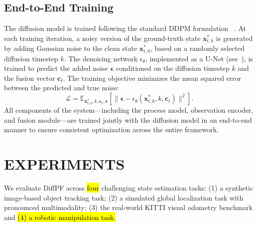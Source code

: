 \subsection{End-to-End Training}
The diffusion model is trained following the standard DDPM formulation ~\cite{ho2020denoising}. 
At each training iteration, a noisy version of the ground-truth state $\bm{x}_{t,k}^*$ is generated by adding Gaussian noise to the clean state $\bm{x}_{t,0}^*$, based on a randomly selected diffusion timestep $k$.
The denoising network $\epsilon_\theta$, implemented as a U-Net (see~), is trained to predict the added noise $\bm{\epsilon}$ conditioned on the diffusion timestep $k$ and the fusion vector $\bm{c}_t$.
The training objective minimizes the mean squared error between the predicted and true noise:
\begin{equation}
\mathcal{L} = 
\mathbb{E}_{\bm{x}_{t,0}^*, k, \bm{c}_t, \bm{\epsilon}}
\left[\|\bm{\epsilon} - \epsilon_\theta(\bm{x}_{t,k}^*, k, \bm{c}_t)\|^2\right].
\label{eq:loss}
\end{equation}
All components of the system—including the process model, observation encoder, and fusion module—are trained jointly with the diffusion model in an end-to-end manner to ensure consistent optimization across the entire framework.

\section{EXPERIMENTS} \label{sec:exp}
We evaluate DiffPF across \hl{four} challenging state estimation tasks: (1) a synthetic image-based object tracking task; (2) a simulated global localization task with pronounced multimodality; (3) the real-world KITTI visual odometry benchmark and \hl{(4) a robotic manipulation task. }

